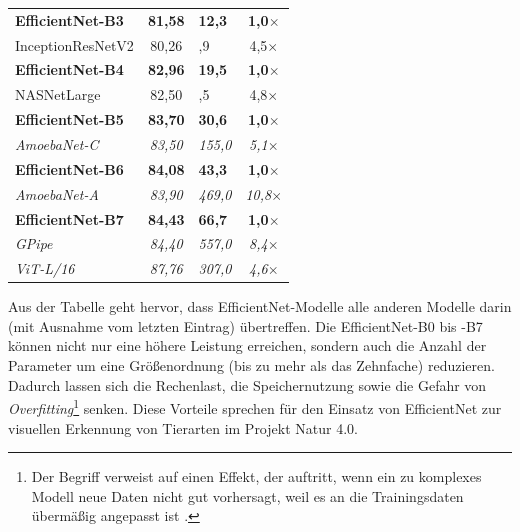 \begin{table}[!ht]
\begin{tabular}{l|c|>{\centering}m{1.7cm}c}
		
		\hline
		\textbf{EfficientNet-B3} & \textbf{81,58} & \textbf{12,3 } & \textbf{1,0$\times$} \\
		InceptionResNetV2 \cite{szegedy2016inceptionv4} & 80,26 & 55,9 & 4,5$\times$\\
		
		
		\hline
		\textbf{EfficientNet-B4} & \textbf{82,96} & \textbf{19,5} & \textbf{1,0$\times$} \\
		NASNetLarge \cite{zoph2018learning} & 82,50 & 93,5 & 4,8$\times$ \\
		
		
		\hline
		\textbf{EfficientNet-B5} & \textbf{83,70} & \textbf{30,6} & \textbf{1,0$\times$} \\	
		\textit{AmoebaNet-C} \cite{cubuk2019autoaugment} & \textit{83,50} & \textit{155,0} & \textit{5,1$\times$} \\		
		
		
		\hline
		\textbf{EfficientNet-B6} & \textbf{84,08} & \textbf{43,3 } & \textbf{1,0$\times$} \\
		\textit{AmoebaNet-A} \cite{real2019regularized} & \textit{83,90} & \textit{469,0} & \textit{10,8$\times$} \\			
		
		
		\hline
		\textbf{EfficientNet-B7} & \textbf{84,43} & \textbf{66,7} & \textbf{1,0$\times$} \\
		\textit{GPipe} \cite{huang2019gpipe} & \textit{84,40} & \textit{557,0} & \textit{8,4$\times$} \\
		\textit{ViT-L/16} \cite{dosovitskiy2021image} & \textit{87,76} & \textit{307,0} & \textit{4,6$\times$} \\	
		\hline
	\end{tabular}
\end{table}

Aus der Tabelle geht hervor, dass EfficientNet-Modelle alle anderen Modelle darin (mit Ausnahme vom letzten Eintrag) übertreffen. Die EfficientNet-B0 bis -B7 können nicht nur eine höhere Leistung erreichen, sondern auch die Anzahl der Parameter um eine Größenordnung (bis zu mehr als das Zehnfache) reduzieren. Dadurch lassen sich die Rechenlast, die Speichernutzung sowie die Gefahr von \emph{Overfitting}\footnote{Der Begriff verweist auf einen Effekt, der auftritt, wenn ein zu komplexes Modell neue Daten nicht gut vorhersagt, weil es an die Trainingsdaten übermäßig angepasst ist \cite{Novustat}.} senken. Diese Vorteile sprechen für den Einsatz von EfficientNet zur visuellen Erkennung von Tierarten im Projekt Natur 4.0.

